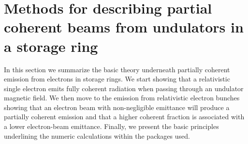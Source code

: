 \documentclass{iucr}              %
\begin{document}
\section{Methods for describing partial coherent beams from undulators in a storage ring}\label{sec:part_coh}

In this section we summarize the basic theory underneath partially coherent emission from electrons in storage rings. We start showing that a relativistic single electron emits fully coherent radiation when passing through an undulator magnetic field. We then move to the emission from relativistic electron bunches showing that an electron beam with non-negligible emittance will produce a partially coherent emission and that a higher coherent fraction is associated with a lower electron-beam emittance. Finally, we present the basic principles underlining the numeric calculations within the packages used.


\end{document}
